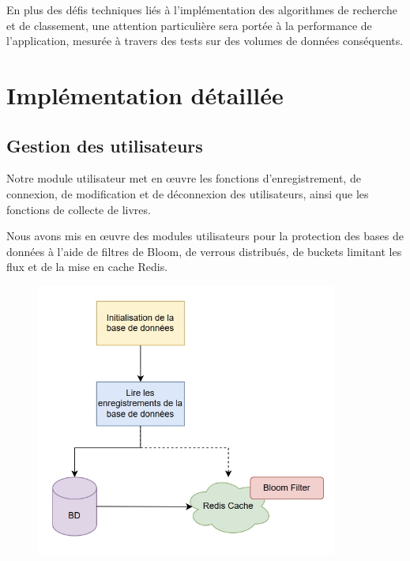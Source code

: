 \documentclass[11pt,english]{article}
\begin{document}
{\begin{itemize}
    \end{itemize}

    \indent En plus des défis techniques liés à l'implémentation des algorithmes de recherche et de classement, une attention particulière sera portée à la performance de l'application, mesurée à travers des tests sur des volumes de données conséquents. 


    \section{Implémentation détaillée}

    \subsection{Gestion des utilisateurs}


    \indent

    Notre module utilisateur met en œuvre les fonctions d'enregistrement, de connexion, de modification et de déconnexion des utilisateurs, ainsi que les fonctions de collecte de livres.

    \indent Nous avons mis en œuvre des modules utilisateurs pour la protection des bases de données à l'aide de filtres de Bloom, de verrous distribués, de buckets limitant les flux et de la mise en cache Redis.

    \begin{figure}[H]
        \begin{center}
            \includegraphics[height=9cm]{./src/DB_Init.png}
        \end{center}
    \end{figure}

}
\end{document}
